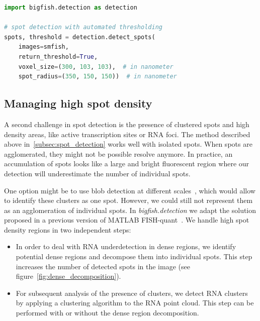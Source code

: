 \begin{minipage}{0.9\textwidth}
\begin{lstlisting}[language=Python]
import bigfish.detection as detection

# spot detection with automated thresholding
spots, threshold = detection.detect_spots(
    images=smfish,
    return_threshold=True,
    voxel_size=(300, 103, 103),  # in nanometer
    spot_radius=(350, 150, 150))  # in nanometer
\end{lstlisting}
\end{minipage}

\subsection{Managing high spot density}
\label{subsec:dense_decomposition}

A second challenge in spot detection is the presence of clustered spots and high density areas, like active transcription sites or \ac{RNA} foci.
The method described above in~\ref{subsec:spot_detection} works well with isolated spots.
When spots are agglomerated, they might not be possible resolve anymore.
In practice, an accumulation of spots looks like a large and bright fluorescent region where our detection will underestimate the number of individual spots.

One option might be to use blob detection at different scales~\cite{walt_scikit-image_2014}, which would allow to identify these clusters as one spot.
However, we could still not represent them as an agglomeration of individual spots.
In \emph{bigfish.detection} we adapt the solution proposed in a previous version of MATLAB FISH-quant~\cite{mueller_fish-quant_2013, samacoits_computational_2018}.
We handle high spot density regions in two independent steps:

\begin{itemize}
	\setlength\itemsep{0.1em}
	\item In order to deal with \ac{RNA} underdetection in dense regions, we identify potential dense regions and decompose them into individual spots.
	This step increases the number of detected spots in the image (see figure~\ref{fig:dense_decomposition}).
	\item For subsequent analysis of the presence of clusters, we detect \ac{RNA} clusters by applying a clustering algorithm to the \ac{RNA} point cloud.
	This step can be performed with or without the dense region decomposition.
\end{itemize}

